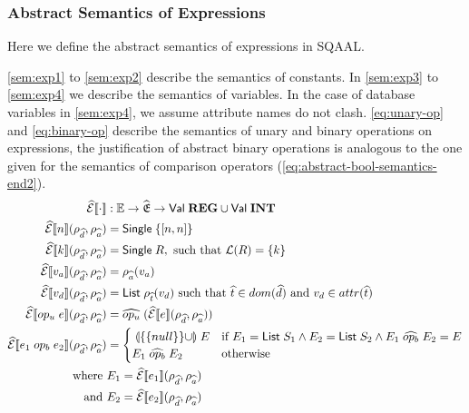 \subsubsection{Abstract Semantics of Expressions}

Here we define the abstract semantics of expressions in SQAAL.

\autoref{sem:exp1} to \ref{sem:exp2} describe the semantics of constants.
In \autoref{sem:exp3} to \ref{sem:exp4} we describe the semantics of variables.
In the case of database variables in \autoref{sem:exp4}, we assume attribute names do not clash.
\autoref{eq:unary-op} and \ref{eq:binary-op} describe the semantics of unary and binary operations on expressions, the justification of abstract binary operations is analogous to the one given for the semantics of comparison operators (\autoref{eq:abstract-bool-semantics-end2}).
\begin{align}\label{sem:exp1}
    \absexpsem{\cdot} &: \mathbb{E} \rightarrow \ab{\mathfrak{E}} \rightarrow \mathsf{Val} \; \mathbf{REG} \cup \mathsf{Val} \; \mathbf{INT}\\
    \absexpsem{n}(\rho_{\ab{d}}, \rho_{\ab{a}}) &= \mathsf{Single} \; \{ [n, n] \} \\\label{sem:exp2}
    \absexpsem{k}(\rho_{\ab{d}}, \rho_{\ab{a}}) &= \mathsf{Single} \; R,  \text{ such that }\mathcal{L}(R) = \{ k \} \\ \label{sem:exp3}
    \absexpsem{v_a}(\rho_{\ab{d}}, \rho_{\ab{a}}) &=  \rho_{\ab{a}}(v_a) \\ \label{sem:exp4}
    \absexpsem{v_d}(\rho_{\ab{d}}, \rho_{\ab{a}}) &=  \mathsf{List} \; \rho_{\ab{t}}(v_d) \text{ such that } \ab{t} \in dom(\ab{d}) \text{ and } v_d \in attr(\ab{t}) \\ \label{eq:exp-lookup}
    \absexpsem{op_u \; e}(\rho_{\ab{d}}, \rho_{\ab{a}}) &= \ab{op_u} \; (\absexpsem{e}(\rho_{\ab{d}}, \rho_{\ab{a}})) \\ \label{eq:unary-op}
    \absexpsem{e_1 \;op_b\; e_2}(\rho_{\ab{d}}, \rho_{\ab{a}}) &=
    \begin{cases}
        \app{\{\{null\}\} \cup} E & \text{if } E_1 = \mathsf{List} \; S_1 \land E_2 = \mathsf{List} \; S_2 \land E_1 \;\ab{op_b}\; E_2 = E\\
        E_1 \;\ab{op_b}\; E_2 & \text{otherwise}\\
    \end{cases} \\ \label{eq:binary-op}
    \text{where } & E_1 = \absexpsem{e_1}(\rho_{\ab{d}}, \rho_{\ab{a}}) \\
    \text{and } & E_2 = \absexpsem{e_2}(\rho_{\ab{d}}, \rho_{\ab{a}})
\end{align}

